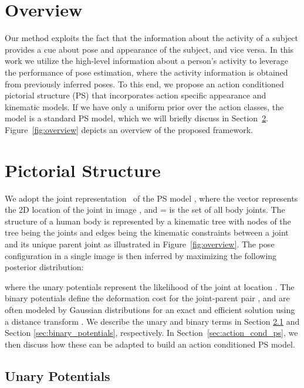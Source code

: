 \documentclass[a4paper, 10pt, conference]{ieeeconf}      \usepackage{FG2017}
\begin{document}
\section{Overview}\label{sec:overview}

Our method exploits the fact that the information about the activity of a subject provides a cue about pose and appearance of the subject, and vice versa. 
In this work we utilize the high-level information about a person's activity to leverage the performance of pose estimation, where the activity information is obtained from previously inferred poses. To this end, we propose an action conditioned pictorial structure (PS) that incorporates action specific appearance and kinematic models. If we have only a uniform prior over the action classes, the model is a standard PS model, which we will briefly discuss in Section~\ref{sec:PS_model}. Figure~\ref{fig:overview} depicts an overview of the proposed framework.    

\section{Pictorial Structure}\label{sec:PS_model}

We adopt the joint representation~\cite{dantone_tpami2014} of the PS model \cite{Felzenszwalb_ijcv2005}, where the vector  represents the 2D location of the  joint in image , and  =  is the set of all body joints. The structure of a human body is represented by a kinematic tree with nodes of the tree being the joints  and edges  being the kinematic constraints between a joint  and its unique parent joint  as illustrated in Figure~\ref{fig:overview}. The pose configuration in a single image is then inferred by maximizing the following posterior distribution:

where the unary potentials  represent the likelihood of the  joint at location . The binary potentials  define the deformation cost for the joint-parent pair , and are often modeled by Gaussian distributions for an exact and efficient solution using a distance transform \cite{Felzenszwalb_ijcv2005}. 
We describe the unary and binary terms in Section \ref{sec:unary_potentials} and Section \ref{sec:binary_potentials}, respectively. In Section~\ref{sec:action_cond_ps}, we then discuss how these can be adapted to build an action conditioned PS model.


\subsection{Unary Potentials}
\label{sec:unary_potentials}
\end{document}
